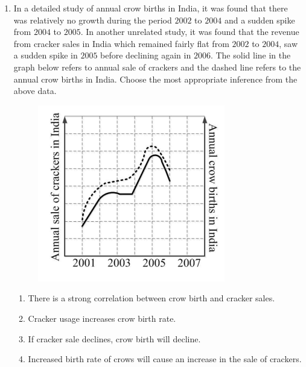 \documentclass[journal,12pt,onecolumn]{IEEEtran}
\theoremstyle{remark}
\begin{document}
\begin{enumerate}
    \item In a detailed study of annual crow births in India, it was found that there was relatively no growth during the period $2002$ to $2004$ and a sudden spike from $2004$ to $2005$. In another unrelated study, it was found that the revenue from cracker sales in India which remained fairly flat from $2002$ to $2004$, saw a sudden spike in $2005$ before declining again in $2006$. The solid line in the graph below refers to annual sale of crackers and the dashed line refers to the annual crow births in India. Choose the most appropriate inference from the above data.
    \begin{figure}[H]
        \centering
        \includegraphics[width=0.6\columnwidth]{q10.png}
        \caption*{}
        \label{fig:q10}
    \end{figure}
    
    \hfill{}
    \begin{enumerate}
        \item There is a strong correlation between crow birth and cracker sales.
        \item Cracker usage increases crow birth rate.
        \item If cracker sale declines, crow birth will decline.
        \item Increased birth rate of crows will cause an increase in the sale of crackers.
    \end{enumerate}

\end{enumerate}
\end{document}
